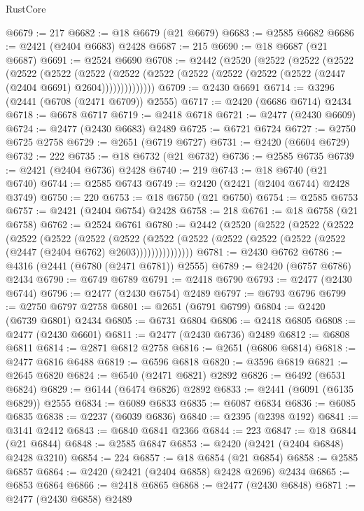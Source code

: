 \begin{lexlean}{RustCore}
\begin{coremodule}
@6679 := 217
@6682 := @18 @6679 (@21 @6679)
@6683 := @2585 @6682
@6686 := @2421 (@2404 @6683) @2428
@6687 := 215
@6690 := @18 @6687 (@21 @6687)
@6691 := @2524 @6690
@6708 := @2442
    (@2520
      (@2522
        (@2522
          (@2522
            (@2522
              (@2522
                (@2522
                  (@2522 (@2522 (@2522 (@2522 (@2522 (@2522 (@2447 (@2404 @6691) @2604))))))))))))))
@6709 := @2430 @6691
@6714 := @3296 (@2441 (@6708 (@2471 @6709)) @2555)
@6717 := @2420 (@6686 @6714) @2434
@6718 := @6678 @6717
@6719 := @2418 @6718
@6721 := @2477 (@2430 @6609)
@6724 := @2477 (@2430 @6683) @2489
@6725 := @6721 @6724
@6727 := @2750 @6725 @2758
@6729 := @2651 (@6719 @6727)
@6731 := @2420 (@6604 @6729)
@6732 := 222
@6735 := @18 @6732 (@21 @6732)
@6736 := @2585 @6735
@6739 := @2421 (@2404 @6736) @2428
@6740 := 219
@6743 := @18 @6740 (@21 @6740)
@6744 := @2585 @6743
@6749 := @2420 (@2421 (@2404 @6744) @2428 @3749)
@6750 := 220
@6753 := @18 @6750 (@21 @6750)
@6754 := @2585 @6753
@6757 := @2421 (@2404 @6754) @2428
@6758 := 218
@6761 := @18 @6758 (@21 @6758)
@6762 := @2524 @6761
@6780 := @2442
    (@2520
      (@2522
        (@2522
          (@2522
            (@2522
              (@2522
                (@2522
                  (@2522
                    (@2522
                      (@2522 (@2522 (@2522 (@2522 (@2522 (@2447 (@2404 @6762) @2603)))))))))))))))
@6781 := @2430 @6762
@6786 := @4316 (@2441 (@6780 (@2471 @6781)) @2555)
@6789 := @2420 (@6757 @6786) @2434
@6790 := @6749 @6789
@6791 := @2418 @6790
@6793 := @2477 (@2430 @6744)
@6796 := @2477 (@2430 @6754) @2489
@6797 := @6793 @6796
@6799 := @2750 @6797 @2758
@6801 := @2651 (@6791 @6799)
@6804 := @2420 (@6739 @6801) @2434
@6805 := @6731 @6804
@6806 := @2418 @6805
@6808 := @2477 (@2430 @6601)
@6811 := @2477 (@2430 @6736) @2489
@6812 := @6808 @6811
@6814 := @2871 @6812 @2758
@6816 := @2651 (@6806 @6814)
@6818 := @2477 @6816 @6488
@6819 := @6596 @6818
@6820 := @3596 @6819
@6821 := @2645 @6820
@6824 := @6540 (@2471 @6821) @2892
@6826 := @6492 (@6531 @6824)
@6829 := @6144 (@6474 @6826) @2892
@6833 := @2441 (@6091 (@6135 @6829)) @2555
@6834 := @6089 @6833
@6835 := @6087 @6834
@6836 := @6085 @6835
@6838 := @2237 (@6039 @6836)
@6840 := @2395 (@2398 @192)
@6841 := @3141 @2412
@6843 := @6840 @6841 @2366
@6844 := 223
@6847 := @18 @6844 (@21 @6844)
@6848 := @2585 @6847
@6853 := @2420 (@2421 (@2404 @6848) @2428 @3210)
@6854 := 224
@6857 := @18 @6854 (@21 @6854)
@6858 := @2585 @6857
@6864 := @2420 (@2421 (@2404 @6858) @2428 @2696) @2434
@6865 := @6853 @6864
@6866 := @2418 @6865
@6868 := @2477 (@2430 @6848)
@6871 := @2477 (@2430 @6858) @2489

\end{coremodule}
\end{lexlean}
